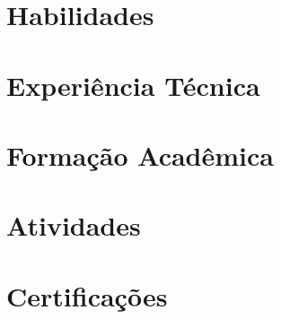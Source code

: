 \documentclass[10pt]{article}
\begin{document}
\pagestyle{others}\thispagestyle{first_page}



\section{Habilidades}


\section{Experiência Técnica}



\section{Formação Acadêmica}


\section{Atividades}


\section{Certificações}

\end{document}
